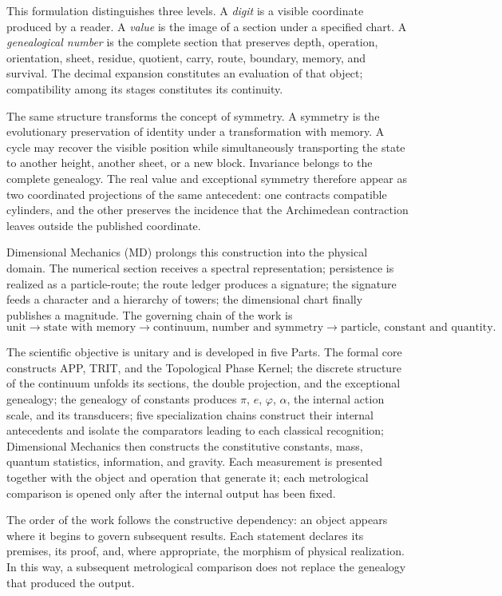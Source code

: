 This formulation distinguishes three levels. A \emph{digit} is a visible coordinate
produced by a reader. A \emph{value} is the image of a section
under a specified chart. A \emph{genealogical number} is the complete
section that preserves depth, operation, orientation, sheet, residue,
quotient, carry, route, boundary, memory, and survival. The decimal expansion
constitutes an evaluation of that object; compatibility among its
stages constitutes its continuity.

The same structure transforms the concept of symmetry. A symmetry is the
evolutionary preservation of identity under a transformation with memory.
A cycle may recover the visible position while simultaneously transporting the
state to another height, another sheet, or a new block. Invariance belongs to
the complete genealogy. The real value and exceptional symmetry therefore appear
as two coordinated projections of the same antecedent:
one contracts compatible cylinders, and the other preserves the incidence that the
Archimedean contraction leaves outside the published coordinate.

Dimensional Mechanics (MD) prolongs this construction into the physical domain.
The numerical section receives a spectral representation; persistence is
realized as a particle-route; the route ledger produces a signature; the
signature feeds a character and a hierarchy of towers; the dimensional chart
finally publishes a magnitude. The governing chain of the work is
\[
 \text{unit}\longrightarrow\text{state with memory}
 \longrightarrow\text{continuum, number and symmetry}
 \longrightarrow\text{particle, constant and quantity}.
\]

The scientific objective is unitary and is developed in five Parts. The formal core constructs APP, TRIT, and the Topological Phase Kernel; the discrete structure of the continuum unfolds its sections, the double projection, and the exceptional genealogy; the genealogy of constants produces \(\pi\), \(e\), \(\varphi\), \(\alpha\), the internal action scale, and its transducers; five specialization chains construct their internal antecedents and isolate the comparators leading to each classical recognition; Dimensional Mechanics then constructs the constitutive constants, mass, quantum statistics, information, and gravity. Each measurement is presented together with the object and operation that generate it; each metrological comparison is opened only after the internal output has been fixed.

The order of the work follows the constructive dependency: an object appears where
it begins to govern subsequent results. Each statement declares
its premises, its proof, and, where appropriate, the morphism of
physical realization. In this way, a subsequent metrological comparison does not
replace the genealogy that produced the output.

